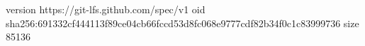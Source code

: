 version https://git-lfs.github.com/spec/v1
oid sha256:691332cf444113f89ce04cb66fccd53d8fc068e9777cdf82b34f0c1c83999736
size 85136
